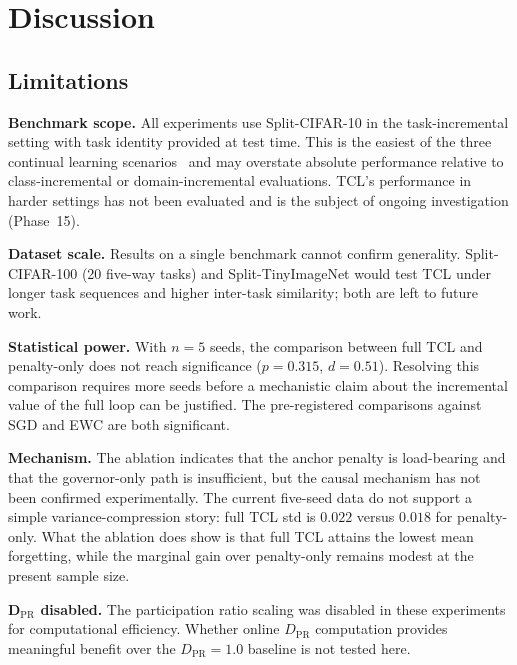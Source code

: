 
\section{Discussion}
\label{sec:discussion}

\subsection{Limitations}

\textbf{Benchmark scope.}
All experiments use Split-CIFAR-10 in the task-incremental setting with task identity
provided at test time.
This is the easiest of the three continual learning scenarios~\cite{vandeVen2019}
and may overstate absolute performance relative to class-incremental or
domain-incremental evaluations.
TCL's performance in harder settings has not been evaluated and is the subject of
ongoing investigation (Phase~15).

\textbf{Dataset scale.}
Results on a single benchmark cannot confirm generality.
Split-CIFAR-100 (20 five-way tasks) and Split-TinyImageNet would test TCL under
longer task sequences and higher inter-task similarity; both are left to future work.

\textbf{Statistical power.}
With $n = 5$ seeds, the comparison between full TCL and penalty-only does not reach
significance ($p = 0.315$, $d = 0.51$).
Resolving this comparison requires more seeds before a mechanistic claim about the
incremental value of the full loop can be justified.
The pre-registered comparisons against SGD and EWC are both significant.

\textbf{Mechanism.}
The ablation indicates that the anchor penalty is load-bearing and that the
governor-only path is insufficient, but the causal mechanism has not been
confirmed experimentally.
The current five-seed data do not support a simple variance-compression story:
full TCL std is $0.022$ versus $0.018$ for penalty-only. What the ablation does
show is that full TCL attains the lowest mean forgetting, while the marginal gain
over penalty-only remains modest at the present sample size.

\textbf{D$_{\mathrm{PR}}$ disabled.}
The participation ratio scaling was disabled in these experiments for computational
efficiency.
Whether online $D_{\mathrm{PR}}$ computation provides meaningful benefit over the
$D_{\mathrm{PR}} = 1.0$ baseline is not tested here.

